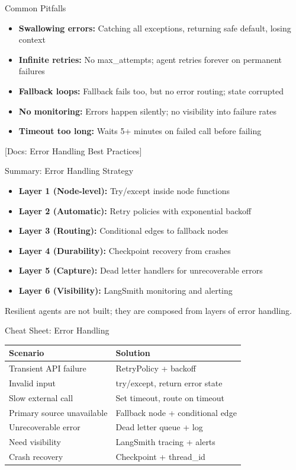 \documentclass[aspectratio=169,11pt]{beamer}
\newcommand{\docref}[1]{{\scriptsize\color{docgray}[Docs: #1]}}
\begin{document}
\begin{frame}{Common Pitfalls}
\setlength{\itemsep}{1pt}
\begin{itemize}
\item \textbf{Swallowing errors:} Catching all exceptions, returning safe default, losing context
\item \textbf{Infinite retries:} No max\_attempts; agent retries forever on permanent failures
\item \textbf{Fallback loops:} Fallback fails too, but no error routing; state corrupted
\item \textbf{No monitoring:} Errors happen silently; no visibility into failure rates
\item \textbf{Timeout too long:} Waits 5+ minutes on failed call before failing
\end{itemize}
\vspace{0.1cm}
\docref{Error Handling Best Practices}
\end{frame}

\begin{frame}{Summary: Error Handling Strategy}
\setlength{\itemsep}{1pt}
\begin{itemize}
\item \textbf{Layer 1 (Node-level):} Try/except inside node functions
\item \textbf{Layer 2 (Automatic):} Retry policies with exponential backoff
\item \textbf{Layer 3 (Routing):} Conditional edges to fallback nodes
\item \textbf{Layer 4 (Durability):} Checkpoint recovery from crashes
\item \textbf{Layer 5 (Capture):} Dead letter handlers for unrecoverable errors
\item \textbf{Layer 6 (Visibility):} LangSmith monitoring and alerting
\end{itemize}
\vspace{0.15cm}
\begin{conceptbox}[Remember]
Resilient agents are not built; they are composed from layers of error handling.
\end{conceptbox}
\end{frame}

\begin{frame}{Cheat Sheet: Error Handling}
\small
\begin{tabular}{ll}
\toprule
\textbf{Scenario} & \textbf{Solution} \\
\midrule
Transient API failure & RetryPolicy + backoff \\
Invalid input & try/except, return error state \\
Slow external call & Set timeout, route on timeout \\
Primary source unavailable & Fallback node + conditional edge \\
Unrecoverable error & Dead letter queue + log \\
Need visibility & LangSmith tracing + alerts \\
Crash recovery & Checkpoint + thread\_id \\
\bottomrule
\end{tabular}
\end{frame}
\end{document}
